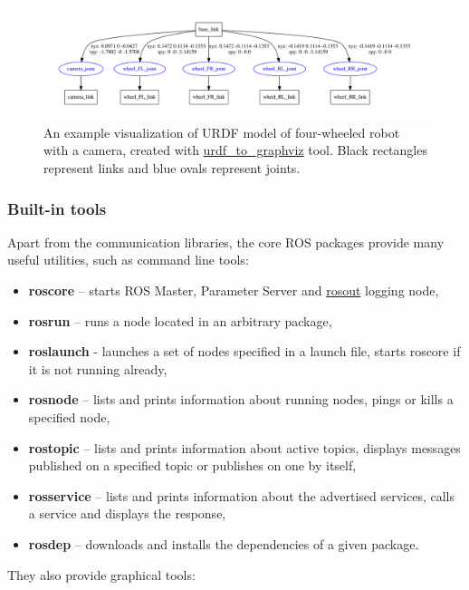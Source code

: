 \documentclass[english,inz,shortabstract]{iithesis}
\begin{document}
    \begin{figure}[ht]
        \centering
        \captionsetup{margin=1cm}
        \includegraphics[width=\textwidth]{img/leo_description.pdf}
        \caption{An example visualization of URDF model of four-wheeled robot with a camera, created with \href{http://wiki.ros.org/urdf\#Visualization}{urdf\_to\_graphviz} tool. Black rectangles represent links and blue ovals represent joints.}
        \label{fig:husky}
    \end{figure}

\pagebreak

        \subsubsection{Built-in tools}
        Apart from the communication libraries, the core ROS packages provide many useful utilities, such as command line tools:

        \begin{itemize}[itemsep=0pt, parsep=2pt, topsep=0pt]
            \item \textbf{roscore} -- starts ROS Master, Parameter Server and \href{http://wiki.ros.org/rosout#rosout-1}{rosout} logging node,
            \item \textbf{rosrun} -- runs a node located in an arbitrary package,
            \item \textbf{roslaunch} - launches a set of nodes specified in a launch file, starts roscore if it is not running already,
            \item \textbf{rosnode} -- lists and prints information about running nodes, pings or kills a specified node,
            \item \textbf{rostopic} -- lists and prints information about active topics, displays messages published on a specified topic or publishes on one by itself,
            \item \textbf{rosservice} -- lists and prints information about the advertised services, calls a service and displays the response,
            \item \textbf{rosdep} -- downloads and installs the dependencies of a given package.
        \end{itemize}
        They also provide graphical tools:
\end{document}
